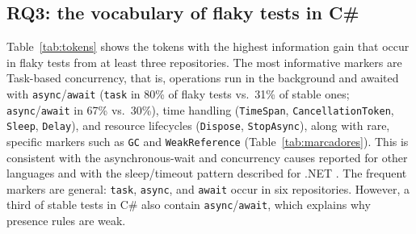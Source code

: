 \subsection{RQ3: the vocabulary of flaky tests in C\#}
\label{sec:rq3}
Table~\ref{tab:tokens} shows the tokens with the highest information gain that occur in flaky tests from at least three repositories. The most informative markers are Task-based concurrency, that is, operations run in the background and awaited with \texttt{async}/\texttt{await} (\texttt{task} in 80\% of flaky tests vs.\ 31\% of stable ones; \texttt{async}/\texttt{await} in 67\% vs.\ 30\%), time handling (\texttt{TimeSpan}, \texttt{CancellationToken}, \texttt{Sleep}, \texttt{Delay}), and resource lifecycles (\texttt{Dispose}, \texttt{StopAsync}), along with rare, specific markers such as \texttt{GC} and \texttt{WeakReference} (Table~\ref{tab:marcadores}). This is consistent with the asynchronous-wait and concurrency causes reported for other languages \cite{luo2014empirical, barbosa2023test} and with the sleep/timeout pattern described for .NET \cite{leesatapornwongsa2022flakerepro}. The frequent markers are general: \texttt{task}, \texttt{async}, and \texttt{await} occur in six repositories. However, a third of stable tests in C\# also contain \texttt{async}/\texttt{await}, which explains why presence rules are weak. 

